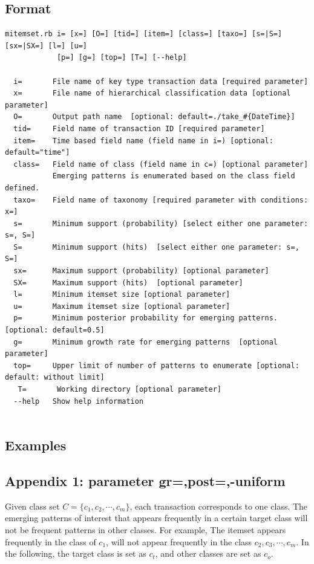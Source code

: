 \subsection*{Format}
\begin{verbatim}
mitemset.rb i= [x=] [O=] [tid=] [item=] [class=] [taxo=] [s=|S=] [sx=|SX=] [l=] [u=]
            [p=] [g=] [top=] [T=] [--help]
            
  i=       File name of key type transaction data [required parameter]
  x=       File name of hierarchical classification data [optional parameter] 
  O=       Output path name  [optional: default=./take_#{DateTime}]
  tid=     Field name of transaction ID [required parameter]
  item=    Time based field name (field name in i=) [optional: default="time"] 
  class=   Field name of class (field name in c=) [optional parameter] 
           Emerging patterns is enumerated based on the class field defined. 
  taxo=    Field name of taxonomy [required parameter with conditions: x=]
  s=       Minimum support (probability) [select either one parameter: s=, S=]
  S=       Minimum support (hits)  [select either one parameter: s=, S=]
  sx=      Maximum support (probability) [optional parameter] 
  SX=      Maximum support (hits)  [optional parameter] 
  l=       Minimum itemset size [optional parameter] 
  u=       Maximum itemset size [optional parameter] 
  p=       Minimum posterior probability for emerging patterns.   [optional: default=0.5] 
  g=       Minimum growth rate for emerging patterns  [optional parameter] 
  top=     Upper limit of number of patterns to enumerate [optional: default: without limit] 
   T=       Working directory [optional parameter] 
  --help   Show help information             
            
\end{verbatim}



\subsection{Examples}


\subsection*{Appendix 1: parameter gr=,post=,-uniform\label{sect:ep}}
Given class set $C=\{c_1,c_2,\cdots,c_m\}$, each transaction corresponds to one class.
The emerging patterns of interest that appears frequently in a certain target class will not be frequent patterns in other classes. For example, The itemset appears frequently in the class of $c_1$, will not  appear frequently in the class $c_2,c_3,\cdots,c_m$.
In the following, the target class is set as $c_t$, and other classes are set as $c_o$.

